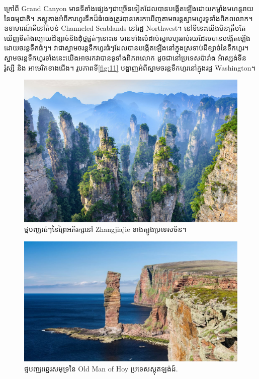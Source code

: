 \documentclass[10pt,twocolumn,letterpaper]{article}
\begin{document}
ក្រៅពី Grand Canyon មានទីតាំងផ្សេងៗជាច្រើនទៀតដែលបានបង្កើតឡើងដោយកម្លាំងមហន្តរាយនៃធម្មជាតិ។ ភស្តុតាងអំពីការហូរទឹកដ៏ធំធេងត្រូវបានគេរកឃើញតាមចរន្តស្នាមហូរទូទាំងពិភពលោក។ ឧទាហរណ៍គឺនៅតំបន់ Channeled Scablands នៅរដ្ឋ Northwest។ នៅទីនេះយើងមិនត្រឹមតែឃើញទីតាំងល្បាយដីខ្សាច់និងដុំថ្មផ្នត់ៗនោះទេ មានទាំងលំដាប់ស្នាមហូររាប់រយដែលបានបង្កើតឡើងដោយចរន្តទឹកធំៗ\cite{78,79}។ វាជាស្នាមចរន្តទឹកហូរធំៗដែលបានបង្កើតឡើងនៅក្នុងស្រទាប់ដីខ្សាច់នៃទឹកហូរ។ ស្នាមចរន្តទឹកហូរទាំងនេះយើងអាចរកវាបានទូទាំងពិភពលោក ដូចជានៅប្រទេសប៉ារាំង អ៉ាស្សង់ទីន រ៉ូស្សី និង អាមេរិកខាងជើង\cite{81}។ រូបភាពទី\ref{fig:11} បង្ហាញអំពីស្នាមចរន្តទឹកហូរនៅក្នុងរដ្ឋ Washington\cite{80}។

\begin{figure}[b]
\begin{center}
   \includegraphics[width=1\linewidth]{zhangjiajie.jpg}
\end{center}
   \caption{ថ្មបញ្ឈរធំៗនៃព្រៃអភិរក្សនៅ Zhangjiajie ខាងត្បូងប្រទេសចិន។}
\label{fig:12}
\label{fig:onecol}
\end{figure}

\begin{figure}[t]
\begin{center}

   \includegraphics[width=1\linewidth]{hoy.jpg}
\end{center}
   \caption{ថ្មបញ្ឈរឆ្នេរសមុទ្រនៃ Old Man of Hoy ប្រទេសស្កុតឡង់ដ៍\cite{83}.}
\label{fig:13}
\label{fig:onecol}
\end{figure}
\end{document}
